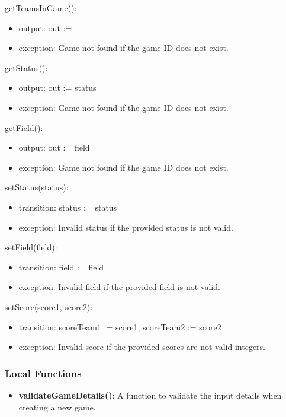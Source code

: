 \documentclass[12pt, titlepage]{article}
\begin{document}
\noindent getTeamsInGame():
\begin{itemize}
  \item output: out := 
  \item exception: Game not found if the game ID does not exist.
\end{itemize}

\noindent getStatus():
\begin{itemize}
  \item output: out := status
  \item exception: Game not found if the game ID does not exist.
\end{itemize}

\noindent getField():
\begin{itemize}
  \item output: out := field
  \item exception: Game not found if the game ID does not exist.
\end{itemize}

\noindent setStatus(status):
\begin{itemize}
  \item transition: status := status
  \item exception: Invalid status if the provided status is not valid.
\end{itemize}

\noindent setField(field):
\begin{itemize}
  \item transition: field := field
  \item exception: Invalid field if the provided field is not valid.
\end{itemize}

\noindent setScore(score1, score2):
\begin{itemize}
  \item transition: scoreTeam1 := score1, scoreTeam2 := score2
  \item exception: Invalid score if the provided scores are not valid integers.
\end{itemize}

\subsubsection{Local Functions}
\begin{itemize}
  \item \textbf{validateGameDetails()}: A function to validate the input details when creating a new game.
\end{itemize}
\end{document}

